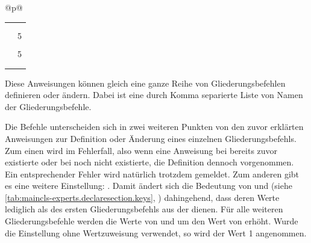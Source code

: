 \begin{longtable}{@{}p{\columnwidth}@{}}
\begin{tabularx}{\linewidth}{ll}
                           \autopageref{tab:maincls.structureElementsFont} \\
    \PValue{indent}      & \Macro{scr@parindent} \\
    \PValue{level}       & 5 \\
    \PValue{tocindent}   & \PValue{12em}\\
    \PValue{toclevel}    & 5 \\
    \PValue{tocnumwidth} & \PValue{6em}\\
    \PValue{tocstyle}    & \PValue{section} \\
    \bottomrule
    \end{tabularx}
  \end{longtable}
\EndIndexGroup


\begin{Declaration}
\end{Declaration}
Diese Anweisungen können gleich eine ganze Reihe von
Gliederungsbefehlen definieren oder ändern. Dabei ist  eine
durch Komma separierte Liste von Namen der Gliederungsbefehle.

Die Befehle unterscheiden sich in zwei weiteren Punkten von den zuvor
erklärten Anweisungen zur Definition oder Änderung eines einzelnen
Gliederungsbefehls. Zum einen wird im Fehlerfall,
also wenn eine Anweisung bei  bereits zuvor
existierte oder bei  noch nicht existierte,
die Definition dennoch vorgenommen. Ein entsprechender Fehler wird natürlich
trotzdem gemeldet.  Zum anderen gibt es eine weitere Einstellung:
.
Damit ändert sich die Bedeutung von  und 
(siehe \autoref{tab:maincls-experts.declaresection.keys},
) dahingehend, dass deren
Werte lediglich als  des ersten Gliederungsbefehls aus
der  dienen. Für alle weiteren Gliederungsbefehle werden
die Werte von  und  um den Wert von
 erhöht. Wurde die Einstellung 
ohne Wertzuweisung verwendet, so wird der Wert 1 angenommen.%
\EndIndexGroup


